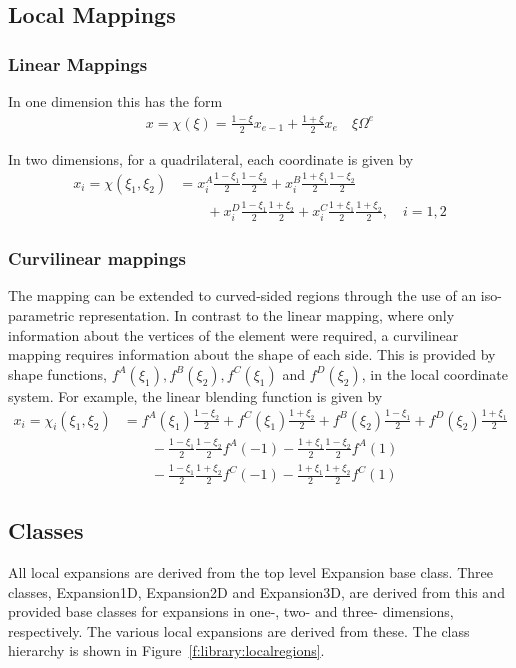 \subsection{Local Mappings}

\subsubsection{Linear Mappings}
In one dimension this has the form
\begin{align*}
x = \chi(\xi) = \frac{1-\xi}{2}x_{e-1} + \frac{1+\xi}{2}x_e \quad \xi
\Omega^e
\end{align*}

In two dimensions, for a quadrilateral, each coordinate is given by
\begin{align*}
x_i = \chi(\xi_1,\xi_2) &= x_i^A\frac{1-\xi_1}{2}\frac{1-\xi_2}{2} +
x_i^B\frac{1+\xi_1}{2}\frac{1-\xi_2}{2} \\ &\qquad+
x_i^D\frac{1-\xi_1}{2}\frac{1+\xi_2}{2} +
x_i^C\frac{1+\xi_1}{2}\frac{1+\xi_2}{2}, \quad i=1,2
\end{align*}

\subsubsection{Curvilinear mappings}

The mapping can be extended to curved-sided regions through the use of an
iso-parametric representation. In contrast to the linear mapping, where only
information about the vertices of the element were required, a curvilinear
mapping requires information about the shape of each side. This is provided by
shape functions, $f^A(\xi_1), f^B(\xi_2), f^C(\xi_1)$ and
$f^D(\xi_2)$, in the local coordinate system. For example, the linear
blending function is given by
\begin{align*}
  x_i = \chi_i(\xi_1,\xi_2) &= f^A(\xi_1)\frac{1-\xi_2}{2} +
  f^C(\xi_1)\frac{1+\xi_2}{2} + f^B(\xi_2)\frac{1-\xi_1}{2} +
  f^D(\xi_2)\frac{1+\xi_1}{2}\\ &\qquad-
  \frac{1-\xi_1}{2}\frac{1-\xi_2}{2}f^A(-1) - 
  \frac{1+\xi_1}{2}\frac{1-\xi_2}{2}f^A(1)\\ &\qquad-
  \frac{1-\xi_1}{2}\frac{1+\xi_2}{2}f^C(-1) -
  \frac{1+\xi_1}{2}\frac{1+\xi_2}{2}f^C(1)
\end{align*}

\subsection{Classes}
All local expansions are derived from the top level Expansion base class. Three
classes, Expansion1D, Expansion2D and Expansion3D, are derived from this and
provided base classes for expansions in one-, two- and three- dimensions,
respectively. The various local expansions are derived from these. The class
hierarchy is shown in Figure~\ref{f:library:localregions}.


